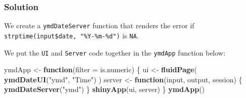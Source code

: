 \documentclass[]{book}
\newenvironment{Shaded}{\begin{snugshade}}{\end{snugshade}}
\newcommand{\ControlFlowTok}[1]{\textcolor[rgb]{0.13,0.29,0.53}{\textbf{#1}}}
\newcommand{\DataTypeTok}[1]{\textcolor[rgb]{0.13,0.29,0.53}{#1}}
\newcommand{\KeywordTok}[1]{\textcolor[rgb]{0.13,0.29,0.53}{\textbf{#1}}}
\newcommand{\NormalTok}[1]{#1}
\newcommand{\OperatorTok}[1]{\textcolor[rgb]{0.81,0.36,0.00}{\textbf{#1}}}
\newcommand{\OtherTok}[1]{\textcolor[rgb]{0.56,0.35,0.01}{#1}}
\newcommand{\StringTok}[1]{\textcolor[rgb]{0.31,0.60,0.02}{#1}}
\begin{document}
\begin{solution}

\hypertarget{solution-3}{%
\subsubsection*{Solution}\label{solution-3}}

We create a \texttt{ymdDateServer} function that renders the error if \texttt{strptime(input\$date,\ "\%Y-\%m-\%d")} is \texttt{NA}.

\begin{Shaded}
\end{Shaded}

We put the \texttt{UI} and \texttt{Server} code together in the \texttt{ymdApp} function below:

\begin{Shaded}
\begin{Highlighting}[]
\NormalTok{ymdApp <-}\StringTok{ }\ControlFlowTok{function}\NormalTok{(}\DataTypeTok{filter =}\NormalTok{ is.numeric) \{}
\NormalTok{    ui <-}\StringTok{ }\KeywordTok{fluidPage}\NormalTok{(}
        \KeywordTok{ymdDateUI}\NormalTok{(}\StringTok{"ymd"}\NormalTok{, }\StringTok{"Time"}\NormalTok{)}
\NormalTok{    )}
\NormalTok{    server <-}\StringTok{ }\ControlFlowTok{function}\NormalTok{(input, output, session) \{}
        \KeywordTok{ymdDateServer}\NormalTok{(}\StringTok{"ymd"}\NormalTok{)}
\NormalTok{    \}}
    \KeywordTok{shinyApp}\NormalTok{(ui, server)}
\NormalTok{\}}
\KeywordTok{ymdApp}\NormalTok{()}
\end{Highlighting}
\end{Shaded}

\end{solution}
\end{document}
